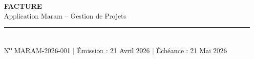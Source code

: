 \documentclass[a4paper,10pt]{article}
\begin{document}
\setlength{\parindent}{0pt}

\begin{center}
  {\LARGE\bfseries FACTURE}\\[4pt]
  {\large Application Maram -- Gestion de Projets}\\[2pt]
  \rule{\linewidth}{0.6pt}\\[2pt]
  {\small N\textsuperscript{o} MARAM-2026-001 \quad|\quad
   \'{E}mission : 21 Avril 2026 \quad|\quad
   \'{E}ch\'{e}ance : 21 Mai 2026}
\end{center}

\vspace{0.5cm}

\end{document}
